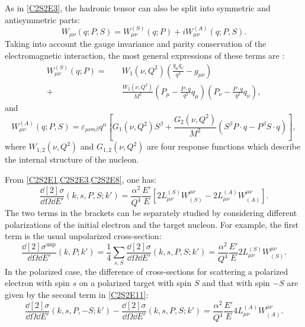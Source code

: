 As in \cref{C2S2E3}, the hadronic tensor can also be split into symmetric and antisymmetric parts:
\begin{equation} \label{C2S2E8}
W_{\mu\nu}(q;P,S) = W_{\mu\nu}^{(S)}(q;P) + iW_{\mu\nu}^{(A)}(q;P,S).
\end{equation}
Taking into account the gauge invariance and parity conservation of the electromagnetic interaction, the most general expressions of these terms are \cite{Anselmino1995}:
\begin{equation} \label{C2S2E9}
\begin{split}
W_{\mu\nu}^{(S)}(q;P) = \quad & W_1(\nu,Q^2)\left(\frac{q_\mu q_\nu}{q^2}-g_{\mu\nu}\right) \\
+ & \frac{W_2(\nu,Q^2)}{M^2}(P_\mu-\frac{P\cdot q}{q^2}q_\mu)(P_\nu-\frac{P\cdot q}{q^2}q_\nu),
\end{split}
\end{equation}
and
\begin{equation} \label{C2S2E10}
W_{\mu\nu}^{(A)}(q;P,S) = \varepsilon_{\mu\nu\alpha\beta}q^\alpha\left[G_1(\nu,Q^2)S^\beta+\frac{G_2(\nu,Q^2)}{M^2}(S^\beta P\cdot q-P^\beta S\cdot q)\right],
\end{equation}
where $W_{1,2}(\nu,Q^2)$ and $G_{1,2}(\nu,Q^2)$ are four response functions which describe the internal structure of the nucleon.

From \cref{C2S2E1,C2S2E3,C2S2E8}, one has:
\begin{equation} \label{C2S2E11}
\frac{\dd[2]{\sigma}}{\dd{\Omega}\dd{E'}}(k,s,P,S;k')= \frac{\alpha^2}{Q^4}\frac{E'}{E}\left[2L_{\mu\nu}^{(S)}W^{\mu\nu}_{(S)}-2L_{\mu\nu}^{(A)}W^{\mu\nu}_{(A)}\right].
\end{equation}
The two terms in the brackets can be separately studied by considering different polarizations of the initial electron and the target nucleon. For example, the first term is the usual unpolarized cross-section:
\begin{equation} \label{C2S2E12}
\frac{\dd[2]{\sigma}^{\mathrm{unp}}}{\dd{\Omega}\dd{E'}}(k,P;k') = \frac{1}{4}\sum_{s,S}\frac{\dd[2]{\sigma}}{\dd{\Omega}\dd{E'}}(k,s,P,S;k') = \frac{\alpha^2}{Q^4}\frac{E'}{E}2L_{\mu\nu}^{(S)}W^{\mu\nu}_{(S)}.
\end{equation}
In the polarized case, the difference of cross-sections for scattering a polarized electron with spin $s$ on a polarized target with spin $S$ and that with spin $-S$ are given by the second term in \cref{C2S2E11}:
\begin{equation} \label{C2S2E13}
\frac{\dd[2]{\sigma}}{\dd{\Omega}\dd{E'}}(k,s,P,-S;k')-\frac{\dd[2]{\sigma}}{\dd{\Omega}\dd{E'}}(k,s,P,S;k') = \frac{\alpha^2}{Q^4}\frac{E'}{E}4L_{\mu\nu}^{(A)}W^{\mu\nu}_{(A)}.
\end{equation}

